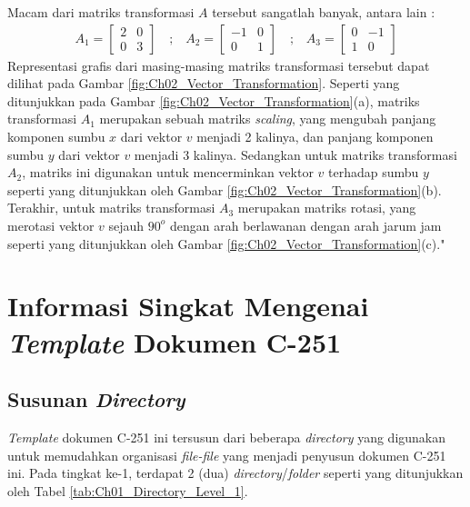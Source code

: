    Macam dari matriks transformasi $A$ tersebut sangatlah banyak, antara lain :
    \begin{equation}
    	\label{eqn:Ch02_Transformation_Matrix}
    	\begin{split}
    		A_1 =
    		\begin{bmatrix}
    			2 & 0 \\ 0 & 3
    		\end{bmatrix}
    		\quad \text{;} \quad
    		A_2 =
    		\begin{bmatrix}
    			-1 & 0 \\ 0 & 1
    		\end{bmatrix}
    		\quad \text{;} \quad
    		A_3 =
    		\begin{bmatrix}
    			0 & -1 \\ 1 & 0
    		\end{bmatrix}
    	\end{split}
    \end{equation}
    Representasi grafis dari masing-masing matriks transformasi tersebut dapat dilihat pada Gambar \ref{fig:Ch02_Vector_Transformation}. Seperti yang ditunjukkan pada Gambar \ref{fig:Ch02_Vector_Transformation}(a), matriks transformasi $A_1$ merupakan sebuah matriks \textit{scaling}, yang mengubah panjang komponen sumbu $x$ dari vektor $v$ menjadi 2 kalinya, dan panjang komponen sumbu $y$ dari vektor $v$ menjadi 3 kalinya. Sedangkan untuk matriks transformasi $A_2$, matriks ini digunakan untuk mencerminkan vektor $v$ terhadap sumbu $y$ seperti yang ditunjukkan oleh Gambar \ref{fig:Ch02_Vector_Transformation}(b). Terakhir, untuk matriks transformasi $A_3$ merupakan matriks rotasi, yang merotasi vektor $v$ sejauh $90^o$ dengan arah berlawanan dengan arah jarum jam seperti yang ditunjukkan oleh Gambar \ref{fig:Ch02_Vector_Transformation}(c)."


\section{Informasi Singkat Mengenai \textit{Template} Dokumen C-251}
\label{sec:Informasi_Singkat_Mengenai_Template_Dokumen_C-251}

    \subsection{Susunan \textit{Directory}}
    \label{subsec:Susunan_Directory}
    
        \textit{Template} dokumen C-251 ini tersusun dari beberapa \textit{directory} yang digunakan untuk memudahkan organisasi \textit{file-file} yang menjadi penyusun dokumen C-251 ini. Pada tingkat ke-1, terdapat 2 (dua) \textit{directory}/\textit{folder} seperti yang ditunjukkan oleh Tabel \ref{tab:Ch01_Directory_Level_1}.
        
